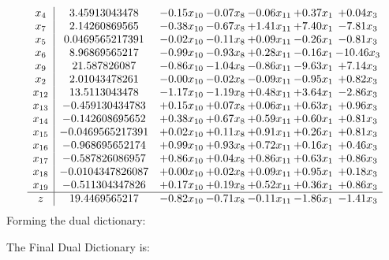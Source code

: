 \documentclass[8pt]{article}
\begin{document}
\[\begin{array}{c| c c@{\hskip 2pt} c@{\hskip 2pt} c@{\hskip 2pt} c@{\hskip 2pt} c@{\hskip 2pt} }
 x_{4}   &  3.45913043478 & -0.15 x_{10} & -0.07 x_{8} & -0.06 x_{11} & +  0.37 x_{1} & +  0.04 x_{3}\\
 x_{7}   &  2.14260869565 & -0.38 x_{10} & -0.67 x_{8} & +  1.41 x_{11} & +  7.40 x_{1} & -7.81 x_{3}\\
 x_{5}   &  0.0469565217391 & -0.02 x_{10} & -0.11 x_{8} & +  0.09 x_{11} & -0.26 x_{1} & -0.81 x_{3}\\
 x_{6}   &  8.96869565217 & -0.99 x_{10} & -0.93 x_{8} & +  0.28 x_{11} & -0.16 x_{1} & -10.46 x_{3}\\
 x_{9}   &  21.587826087 & -0.86 x_{10} & -1.04 x_{8} & -0.86 x_{11} & -9.63 x_{1} & +  7.14 x_{3}\\
 x_{2}   &  2.01043478261 & -0.00 x_{10} & -0.02 x_{8} & -0.09 x_{11} & -0.95 x_{1} & +  0.82 x_{3}\\
 x_{12}   &  13.5113043478 & -1.17 x_{10} & -1.19 x_{8} & +  0.48 x_{11} & +  3.64 x_{1} & -2.86 x_{3}\\
 x_{13}   &  -0.459130434783 & +  0.15 x_{10} & +  0.07 x_{8} & +  0.06 x_{11} & +  0.63 x_{1} & +  0.96 x_{3}\\
 x_{14}   &  -0.142608695652 & +  0.38 x_{10} & +  0.67 x_{8} & +  0.59 x_{11} & +  0.60 x_{1} & +  0.81 x_{3}\\
 x_{15}   &  -0.0469565217391 & +  0.02 x_{10} & +  0.11 x_{8} & +  0.91 x_{11} & +  0.26 x_{1} & +  0.81 x_{3}\\
 x_{16}   &  -0.968695652174 & +  0.99 x_{10} & +  0.93 x_{8} & +  0.72 x_{11} & +  0.16 x_{1} & +  0.46 x_{3}\\
 x_{17}   &  -0.587826086957 & +  0.86 x_{10} & +  0.04 x_{8} & +  0.86 x_{11} & +  0.63 x_{1} & +  0.86 x_{3}\\
 x_{18}   &  -0.0104347826087 & +  0.00 x_{10} & +  0.02 x_{8} & +  0.09 x_{11} & +  0.95 x_{1} & +  0.18 x_{3}\\
 x_{19}   &  -0.511304347826 & +  0.17 x_{10} & +  0.19 x_{8} & +  0.52 x_{11} & +  0.36 x_{1} & +  0.86 x_{3}\\
\hline
z    &  19.4469565217 & -0.82 x_{10} & -0.71 x_{8} & -0.11 x_{11} & -1.86 x_{1} & -1.41 x_{3}\\
\end{array}\]
Forming the dual dictionary:

The Final Dual Dictionary is: 
\end{document}
